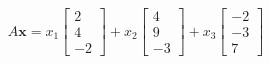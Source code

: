 \documentclass[preview]{standalone}
\begin{document}
\begin{align*}
A\mathbf{x} = x_1 \begin{bmatrix} 2 \\ 4 \\ -2 \end{bmatrix}+ x_2 \begin{bmatrix} 4 \\ 9 \\ -3 \end{bmatrix}+ x_3 \begin{bmatrix} -2 \\ -3 \\ 7 \end{bmatrix}
\end{align*}
\end{document}
